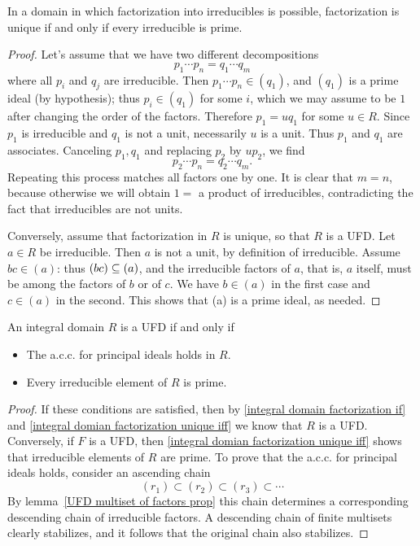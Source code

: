 \begin{proposition}\label{integral domian factorization unique iff}
In a domain in which factorization into irreducibles is possible, factorization is unique if and only if every irreducible is prime.
\end{proposition}
\begin{proof}
Let's assume that we have two different decompositions
\[p_1\cdots p_n=q_1\cdots q_m\]
where all $p_i$ and $q_j$ are irreducible. Then $p_1\cdots p_n\in(q_1)$, and $(q_1)$ is a prime ideal (by hypothesis); thus $p_i\in(q_1)$ for some $i$, which we may assume to be $1$ after changing the order of the factors. Therefore $p_1=uq_1$ for some $u\in R$. Since $p_1$ is irreducible and $q_1$ is not a unit, necessarily $u$ is a unit. Thus $p_1$ and $q_1$ are associates. Canceling $p_1,q_1$ and replacing $p_2$ by $up_2$, we find
\[p_2\cdots p_n=q_2\cdots q_m.\]
Repeating this process matches all factors one by one. It is clear that $m=n$, because otherwise we will obtain $1=$ a product of irreducibles, contradicting the fact that irreducibles are not units.\par
Conversely, assume that factorization in $R$ is unique, so that $R$ is a UFD. Let $a\in R$ be irreducible. Then $a$ is not a unit, by definition of irreducible. Assume $bc\in (a)$: thus $(bc)\subseteq(a)$, and the irreducible factors of $a$, that is, $a$ itself, must be among the factors of $b$ or of $c$. We have $b\in (a)$ in the first case and $c\in (a)$ in the second. This shows that (a) is a prime ideal, as needed.
\end{proof}
\begin{theorem}\label{integral domian is UFD iff}
An integral domain $R$ is a UFD if and only if
\begin{itemize}
\item The a.c.c. for principal ideals holds in $R$.
\item Every irreducible element of $R$ is prime.
\end{itemize}
\end{theorem}
\begin{proof}
If these conditions are satisfied, then by \cref{integral domain factorization if} and \cref{integral domian factorization unique iff} we know that $R$ is a UFD. Conversely, if $F$ is a UFD, then \cref{integral domian factorization unique iff} shows that irreducible elements of $R$ are prime. To prove that the a.c.c. for principal ideals holds, consider an ascending chain
\[(r_1)\subset(r_2)\subset(r_3)\subset\cdots\]
By lemma~\ref{UFD multiset of factors prop} this chain determines a corresponding descending chain of irreducible factors. A descending chain of finite multisets clearly stabilizes, and it follows that the original chain also stabilizes.
\end{proof}
